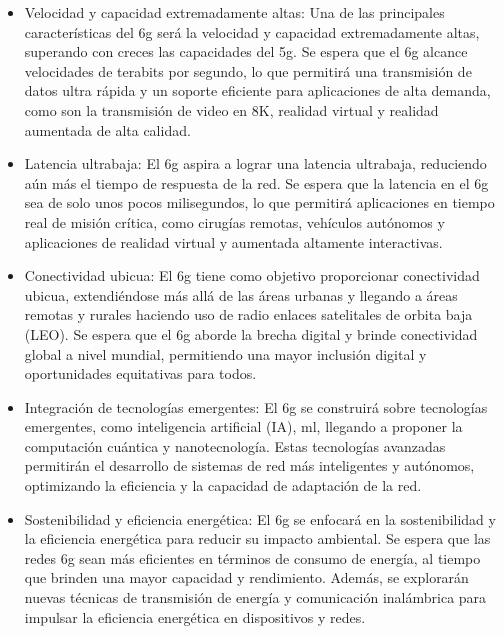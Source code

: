 \begin{itemize}

    \item Velocidad y capacidad extremadamente altas: Una de las principales características del \gls{6g} será la velocidad y capacidad extremadamente altas, superando con creces las capacidades del \gls{5g}. Se espera que el \gls{6g} alcance velocidades de terabits por segundo, lo que permitirá una transmisión de datos ultra rápida y un soporte eficiente para aplicaciones de alta demanda, como son la transmisión de video en 8K, realidad virtual y realidad aumentada de alta calidad.

    \item Latencia ultrabaja: El \gls{6g} aspira a lograr una latencia ultrabaja, reduciendo aún más el tiempo de respuesta de la red. Se espera que la latencia en el \gls{6g} sea de solo unos pocos milisegundos, lo que permitirá aplicaciones en tiempo real de misión crítica, como cirugías remotas, vehículos autónomos y aplicaciones de realidad virtual y aumentada altamente interactivas.

    \item Conectividad ubicua: El \gls{6g} tiene como objetivo proporcionar conectividad ubicua, extendiéndose más allá de las áreas urbanas y llegando a áreas remotas y rurales haciendo uso de radio enlaces satelitales de orbita baja (LEO). Se espera que el \gls{6g} aborde la brecha digital y brinde conectividad global a nivel mundial, permitiendo una mayor inclusión digital y oportunidades equitativas para todos.

    \item Integración de tecnologías emergentes: El \gls{6g} se construirá sobre tecnologías emergentes, como inteligencia artificial (IA), \gls{ml}, llegando a proponer la computación cuántica y nanotecnología. Estas tecnologías avanzadas permitirán el desarrollo de sistemas de red más inteligentes y autónomos, optimizando la eficiencia y la capacidad de adaptación de la red.

    \item Sostenibilidad y eficiencia energética: El \gls{6g} se enfocará en la sostenibilidad y la eficiencia energética para reducir su impacto ambiental. Se espera que las redes \gls{6g} sean más eficientes en términos de consumo de energía, al tiempo que brinden una mayor capacidad y rendimiento. Además, se explorarán nuevas técnicas de transmisión de energía y comunicación inalámbrica para impulsar la eficiencia energética en dispositivos y redes.

\end{itemize}

